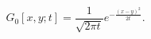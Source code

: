 \begin{equation}
\label{free2}
G_0[x, y; t] = \frac{1}{\sqrt{2 \pi t}} e^{-\frac{(x - y)^2}{2 t}}.
\end{equation}

